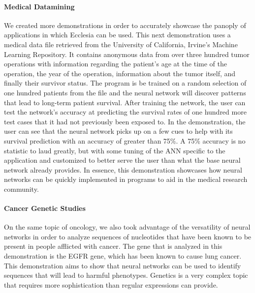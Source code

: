 \documentclass[letterpaper, 10pt]{article}
\begin{document}
		\paragraph{Medical Datamining}
		We created more demonstrations in order to accurately showcase the panoply of applications in which Ecclesia can be used. This next demonstration uses a medical data file retrieved from the University of California, Irvine's Machine Learning Repository. It contains anonymous data from over three hundred tumor operations with information regarding the patient's age at the time of the operation, the year of the operation, information about the tumor itself, and finally their survivor status. The program is be trained on a random selection of one hundred patients from the file and the neural network will discover patterns that lead to long-term patient survival. After training the network, the user can test the network's accuracy at predicting the survival rates of one hundred more test cases that it had not previously been exposed to. In the demonstration, the user can see that the neural network picks up on a few cues to help with its survival prediction with an accuracy of greater than 75\%. A 75\% accuracy is no statistic to laud greatly, but with some tuning of the ANN specific to the application and customized to better serve the user than what the base neural network already provides. In essence, this demonstration showcases how neural networks can be quickly implemented in programs to aid in the medical research community.
		
		\paragraph{Cancer Genetic Studies}
		On the same topic of oncology, we also took advantage of the versatility of neural networks in order to analyze sequences of nucleotides that have been known to be present in people afflicted with cancer. The gene that is analyzed in this demonstration is the EGFR gene, which has been known to cause lung cancer. This demonstration aims to show that neural networks can be used to identify sequences that will lead to harmful phenotypes. Genetics is a very complex topic that requires more sophistication than regular expressions can provide.
		

		
\end{document}
